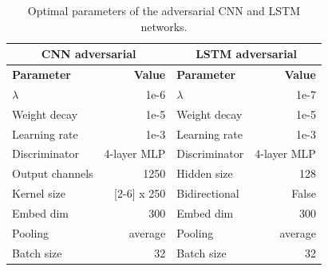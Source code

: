 \documentclass{sigkddExp}
\begin{document}
\begin{table}[h]
    \begin{tabular}{l|r|l|r}
          \multicolumn{2}{c|}{\textbf{CNN adversarial}}
         & \multicolumn{2}{c}{\textbf{LSTM adversarial}}
         \\
         \toprule
         \textbf{Parameter}
         & \textbf{Value}
         & \textbf{Parameter}
         & \textbf{Value}
         \\
         \midrule
         $\lambda$
         & 1e-6
         & $\lambda$
         & 1e-7
         \\
          Weight decay
         & 1e-5 
         & Weight decay
         & 1e-5 
         \\
         Learning rate
         & 1e-3
         & Learning rate
         & 1e-3
         \\
         Discriminator
         & 4-layer MLP
         & Discriminator
         & 4-layer MLP
         \\
         Output channels
         & 1250
         & Hidden size
         & 128
         \\
         Kernel size
         & [2-6] x 250
         & Bidirectional
         & False
         \\
         Embed dim
         & 300
         & Embed dim
         & 300
         \\
         Pooling
         & average
         & Pooling
         & average
         \\
         Batch size
         & 32
         & Batch size
         & 32
    \end{tabular}
    \caption{Optimal parameters of the adversarial CNN and LSTM networks.}
    \label{tab:param_adversarial}
\end{table}
\end{document}
